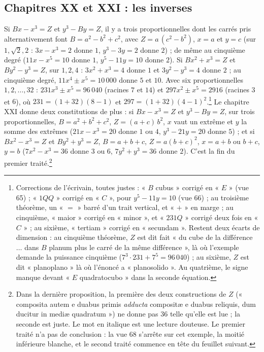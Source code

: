 \documentclass[11pt,a4paper]{article}
\begin{document}
\subsection*{Chapitres XX et XXI : les inverses}

Si $Bx - x^3 = Z$ et $y^3 - By = Z$, il y a trois proportionnelles dont les
carrés pris alternativement font $B = a^2 - b^2 + c^2$, avec $Z = a\,(c^2 - b^2)$,
$x = a$ et $y = c$ (sur $1, \sqrt{2}, 2$ : $3x - x^3 = 2$ donne $1$, $y^3 - 3y = 2$
donne $2$) ; de même au cinquième degré ($11x - x^5 = 10$ donne $1$,
$y^5 - 11y = 10$ donne $2$). Si $Bx^2 + x^3 = Z$ et $By^2 - y^3 = Z$, sur $1, 2, 4$ :
$3x^2 + x^3 = 4$ donne $1$ et $3y^2 - y^3 = 4$ donne $2$ ; au cinquième degré,
$11x^4 \pm x^5 = 10\,000$ donne $5$ et $10$. Avec six proportionnelles
$1, 2, \ldots, 32$ : $231x^3 \pm x^5 = 96\,040$ (racines $7$ et $14$) et
$297x^2 \pm x^5 = 2916$ (racines $3$ et $6$), où $231 = (1 + 32)(8 - 1)$ et
$297 = (1 + 32)(4 - 1)^2$.\footnote{Corrections de l'écrivain, toutes justes :
« $B$ cubus » corrigé en « $E$ » (vue 65) ; « $1QQ$ » corrigé en « $C$ », pour
$y^5 - 11y = 10$ (vue 66) ; au troisième théorème, un « $=$ » barré d'un trait
vertical, et « $+$ » en marge ; au cinquième, « maior » corrigé en « minor », et
« $231Q$ » corrigé deux fois en « $C$ » ; au sixième, « tertiam » corrigé en
« secundam ». Restent deux écarts de dimension : au cinquième théorème, $Z$ est
dit fait « du cube de la différence $\ldots$ dans $B$ planum plus le carré de la même
différence », là où l'exemple demande la puissance cinquième
($7^3 \cdot 231 + 7^5 = 96\,040$) ; au sixième, $Z$ est dit « planoplano » là où
l'énoncé a « planosolido ». Au quatrième, le signe manque devant « $E$
quadratocubo » dans la seconde équation.} Le chapitre XXI donne deux
constitutions de plus : si $Bx - x^3 = Z$ et $y^3 - By = Z$, sur trois
proportionnelles, $B = a^2 + b^2 + c^2$, $Z = (a + c)\,b^2$, $x$ vaut un extrême et
$y$ la somme des extrêmes ($21x - x^3 = 20$ donne $1$ ou $4$, $y^3 - 21y = 20$
donne $5$) ; et si $Bx^2 - x^3 = Z$ et $By^2 + y^3 = Z$, $B = a + b + c$,
$Z = a(b + c)^2$, $x = a + b$ ou $b + c$, $y = b$ ($7x^2 - x^3 = 36$ donne $3$ ou
$6$, $7y^2 + y^3 = 36$ donne $2$). C'est la fin du premier traité.\footnote{Dans la
dernière proposition, la première des deux constructions de $Z$ (« composita
autem e duabus primis \emph{adducta} compositæ e duabus reliquis, dum ducitur in
mediæ quadratum ») ne donne pas $36$ telle qu'elle est lue ; la seconde est
juste. Le mot en italique est une lecture douteuse. Le premier traité n'a pas de
conclusion : la vue 68 s'arrête sur cet exemple, la moitié inférieure blanche, et
le second traité commence en tête du feuillet suivant.}
\end{document}
